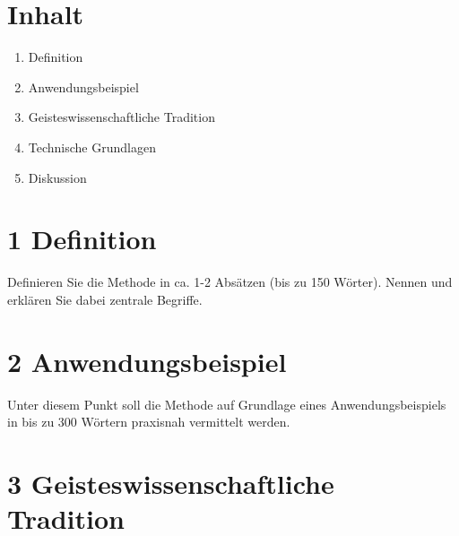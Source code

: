 \documentclass[
          a4paper,
        ]{article}
\providecommand{\tightlist}{%
  \setlength{\itemsep}{0pt}\setlength{\parskip}{0pt}}
\begin{document}
\pagestyle{plain}


\maketitle
















\pagestyle{page}

\renewcommand{\arraystretch}{3}  %

\section{Inhalt}\label{inhalt}

\begin{enumerate}
\def\labelenumi{\arabic{enumi}.}
\tightlist
\item
  Definition
\item
  Anwendungsbeispiel
\item
  Geisteswissenschaftliche Tradition
\item
  Technische Grundlagen
\item
  Diskussion
\end{enumerate}

\section{1 Definition}\label{definition}

Definieren Sie die Methode in ca. 1-2 Absätzen (bis zu 150 Wörter).
Nennen und erklären Sie dabei zentrale Begriffe.

\section{2 Anwendungsbeispiel}\label{anwendungsbeispiel}

Unter diesem Punkt soll die Methode auf Grundlage eines
Anwendungsbeispiels in bis zu 300 Wörtern praxisnah vermittelt werden.

\section{3 Geisteswissenschaftliche
Tradition}\label{geisteswissenschaftliche-tradition}
\end{document}
